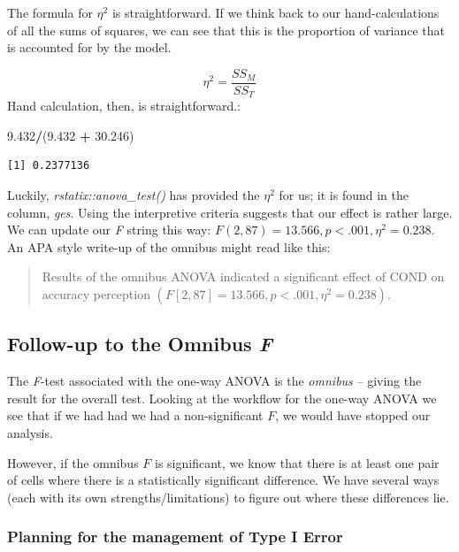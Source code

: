 \documentclass[
  11pt,
]{book}
\newenvironment{Shaded}{\begin{snugshade}}{\end{snugshade}}
\newcommand{\FloatTok}[1]{\textcolor[rgb]{0.06,0.06,0.06}{#1}}
\newcommand{\NormalTok}[1]{#1}
\newcommand{\SpecialCharTok}[1]{\textcolor[rgb]{0.43,0.43,0.43}{\textbf{#1}}}
\begin{document}
The formula for \(\eta^2\) is straightforward. If we think back to our hand-calculations of all the sums of squares, we can see that this is the proportion of variance that is accounted for by the model.

\[\eta ^{2}=\frac{SS_{M}}{SS_{T}}\] Hand calculation, then, is straightforward.:

\begin{Shaded}
\begin{Highlighting}[]
\FloatTok{9.432}\SpecialCharTok{/}\NormalTok{(}\FloatTok{9.432} \SpecialCharTok{+} \FloatTok{30.246}\NormalTok{)}
\end{Highlighting}
\end{Shaded}

\begin{verbatim}
[1] 0.2377136
\end{verbatim}

Luckily, \emph{rstatix::anova\_test()} has provided the \(\eta ^{2}\) for us; it is found in the column, \emph{ges}. Using the interpretive criteria suggests that our effect is rather large. We can update our \emph{F} string this way: \(F(2,87) = 13.566, p < .001, \eta ^{2} = 0.238\). An APA style write-up of the omnibus might read like this:

\begin{quote}
Results of the omnibus ANOVA indicated a significant effect of COND on accuracy perception \((F[2,87] = 13.566, p < .001, \eta ^{2} = 0.238)\).
\end{quote}

\hypertarget{follow-up-to-the-omnibus-f}{%
\subsection{\texorpdfstring{Follow-up to the Omnibus \emph{F}}{Follow-up to the Omnibus F}}\label{follow-up-to-the-omnibus-f}}

The \emph{F}-test associated with the one-way ANOVA is the \emph{omnibus} -- giving the result for the overall test. Looking at the workflow for the one-way ANOVA we see that if we had had we had a non-significant \(F\), we would have stopped our analysis.

However, if the omnibus \(F\) is significant, we know that there is at least one pair of cells where there is a statistically significant difference. We have several ways (each with its own strengths/limitations) to figure out where these differences lie.

\hypertarget{planning-for-the-management-of-type-i-error}{%
\subsubsection{Planning for the management of Type I Error}\label{planning-for-the-management-of-type-i-error}}
\end{document}
